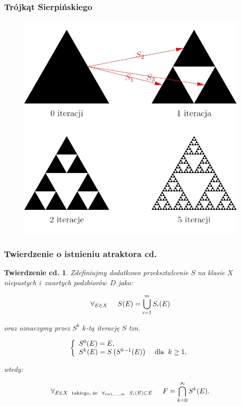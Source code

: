 \documentclass[11pt,usenames,dvipsnames,svgnames,x11names]{beamer}
\theoremstyle{plain}
\newtheorem{twierdzeniecd}{Twierdzenie cd.}
\theoremstyle{definition}
\theoremstyle{remark}
\begin{document}
\begin{frame}   %
\frametitle{Trójkąt Sierpińskiego}
\begin{center}
		\begin{figure}[htbp]
			\includegraphics[scale=0.3]{bs.jpg}
		\end{figure}
	\end{center}
\end{frame}

\begin{frame}   %
\frametitle{Twierdzenie o istnieniu atraktora cd.}
\begin{twierdzeniecd}

Zdefiniujmy dodatkowo przekształcenie $S$ na klasie $X$ niepustych i~zwartych podzbiorów~$D$ jako:

$$
\forall_{E \in X} \hspace{5mm} S(E) = \bigcup^{m}_{i=1} S_i(E)
$$

oraz oznaczymy przez $S^k$  $k$-tą iterację $S$ tzn. 

$$ 
\left\{ 
\begin{array}{l}
S^0(E) = E ,\\
S^k(E) = S\left(S^{k-1}(E)\right) \hspace{4mm}\textrm{dla} \hspace{2mm} k \geq 1, 
\end{array}
\right.
$$

wtedy:

$$
\forall_{E \in X \hspace{2mm} \textrm{takiego, że} \hspace{2mm} \forall_{i=1,\ldots ,m} \hspace{2mm} S_i(E) \subset E} \hspace{5mm} F = \bigcap^{\infty}_{k=0} S^k(E).
$$
\end{twierdzeniecd}
\end{frame}
\end{document}
